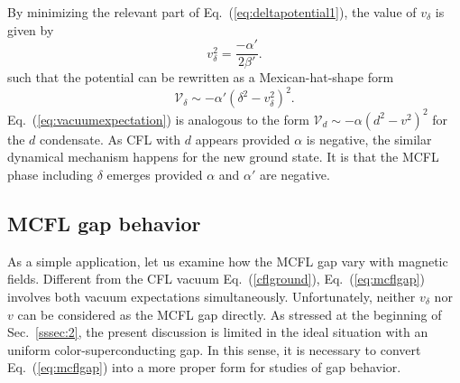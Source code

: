 By minimizing the relevant part of Eq.~(\ref{eq:deltapotential1}), the value of $v_\delta$ is given by
\begin{equation}
\label{eq:vacuumexpectation}
v_\delta^2 = \frac{- \alpha'} {2\beta'}.
\end{equation}
such that the potential can be rewritten as a Mexican-hat-shape form
\begin{equation}
\label{eq:deltapotential}
\mathcal{V}_\delta \sim - \alpha'(\delta^2 - v_\delta^2)^2.
\end{equation}
Eq.~(\ref{eq:vacuumexpectation}) is analogous to the form $\mathcal{V}_d \sim - \alpha (d^2 - v^2)^2$
for the $d$ condensate.
As CFL with $d$ appears provided $\alpha$ is negative, the similar dynamical mechanism happens for
the new ground state. It is that the MCFL phase including $\delta$ emerges provided $\alpha$ and
$\alpha'$ are negative.

\subsection{MCFL gap behavior }
\label{sssec:3}

As a simple application, let us examine how the MCFL gap vary with magnetic fields.
Different from the CFL vacuum Eq.~(\ref{cflground}), Eq.~(\ref{eq:mcflgap}) involves both vacuum
expectations simultaneously. Unfortunately, neither $v_\delta$ nor $v$ can be considered as the
MCFL gap directly. As stressed at the beginning of Sec.~\ref{sssec:2}, the present discussion is
limited in the ideal situation with an uniform color-superconducting gap. In this sense, it is
necessary to convert Eq.~(\ref{eq:mcflgap}) into a more proper form for studies of gap behavior.

